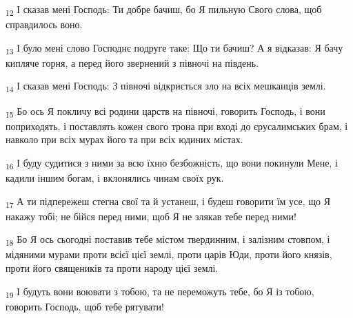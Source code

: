 \begin{tcolorbox}
\textsubscript{12} І сказав мені Господь: Ти добре бачиш, бо Я пильную Свого слова, щоб справдилось воно.
\end{tcolorbox}
\begin{tcolorbox}
\textsubscript{13} І було мені слово Господнє подруге таке: Що ти бачиш? А я відказав: Я бачу кипляче горня, а перед його звернений з півночі на південь.
\end{tcolorbox}
\begin{tcolorbox}
\textsubscript{14} І сказав мені Господь: З півночі відкриється зло на всіх мешканців землі.
\end{tcolorbox}
\begin{tcolorbox}
\textsubscript{15} Бо ось Я покличу всі родини царств на півночі, говорить Господь, і вони поприходять, і поставлять кожен свого трона при вході до єрусалимських брам, і навколо при всіх мурах його та при всіх юдиних містах.
\end{tcolorbox}
\begin{tcolorbox}
\textsubscript{16} І буду судитися з ними за всю їхню безбожність, що вони покинули Мене, і кадили іншим богам, і вклонялись чинам своїх рук.
\end{tcolorbox}
\begin{tcolorbox}
\textsubscript{17} А ти підпережеш стегна свої та й устанеш, і будеш говорити їм усе, що Я накажу тобі; не бійся перед ними, щоб Я не злякав тебе перед ними!
\end{tcolorbox}
\begin{tcolorbox}
\textsubscript{18} Бо Я ось сьогодні поставив тебе містом твердинним, і залізним стовпом, і мідяними мурами проти всієї цієї землі, проти царів Юди, проти його князів, проти його священиків та проти народу цієї землі.
\end{tcolorbox}
\begin{tcolorbox}
\textsubscript{19} І будуть вони воювати з тобою, та не переможуть тебе, бо Я із тобою, говорить Господь, щоб тебе рятувати!
\end{tcolorbox}
